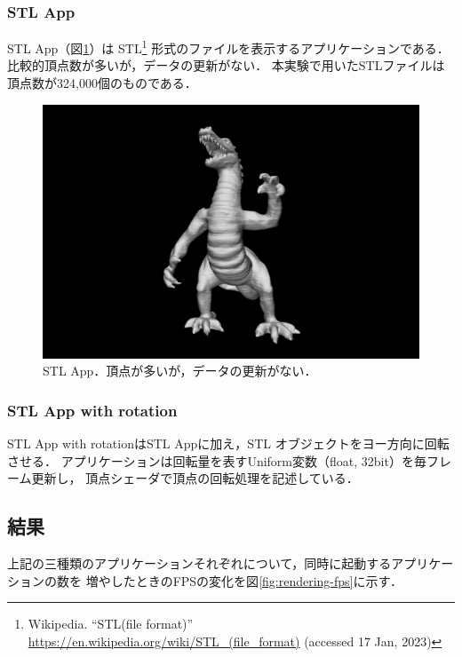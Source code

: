 \subsubsection*{STL App}

STL App（図\ref{fig:stl-app}）は
STL\footnote{Wikipedia. ``STL(file format)'' \url{https://en.wikipedia.org/wiki/STL_(file_format)} (accessed 17 Jan, 2023)}
形式のファイルを表示するアプリケーションである．
比較的頂点数が多いが，データの更新がない．
本実験で用いたSTLファイルは頂点数が324,000個のものである．

\begin{figure}[htbp]
  \centering
  \includegraphics[keepaspectratio, width=0.6\linewidth]{figures/dragon-app.png}
  \caption{
    STL App．頂点が多いが，データの更新がない．
  }
  \label{fig:stl-app}
\end{figure}

\subsubsection*{STL App with rotation}

STL App with rotationはSTL Appに加え，STL オブジェクトをヨー方向に回転させる．
アプリケーションは回転量を表すUniform変数（float, 32bit）を毎フレーム更新し，
頂点シェーダで頂点の回転処理を記述している．

\subsection{結果}

上記の三種類のアプリケーションそれぞれについて，同時に起動するアプリケーションの数を
増やしたときのFPSの変化を図\ref{fig:rendering-fps}に示す．

